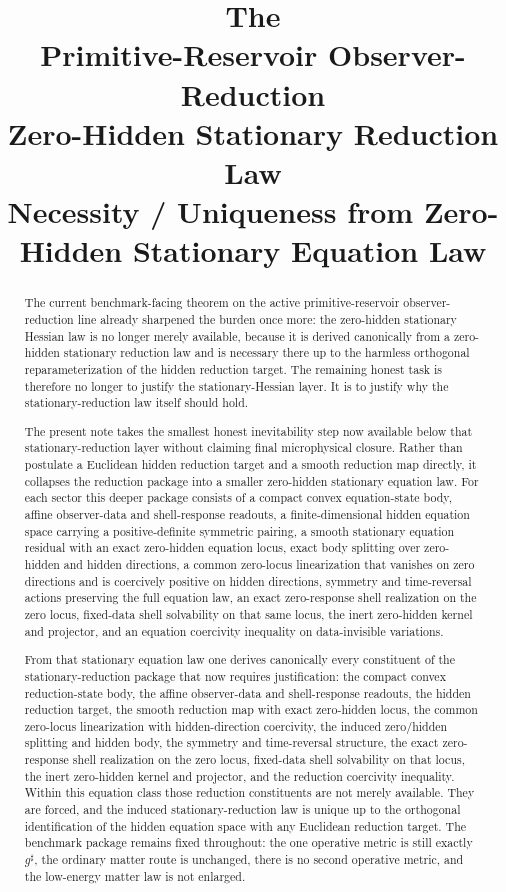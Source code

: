 \documentclass[11pt]{article}
\title{\textbf{The \TheoryName{}}\\[0.4em]
\large Primitive-Reservoir Observer-Reduction\\
\large Zero-Hidden Stationary Reduction Law\\
\large Necessity / Uniqueness from Zero-Hidden Stationary Equation Law}
\author{}
\date{}
\newcommand{\CompletedMetric}{g^{\sharp}}
\begin{document}
\maketitle

\begin{abstract}
The current benchmark-facing theorem on the active primitive-reservoir observer-reduction line already sharpened the burden once more: the zero-hidden stationary Hessian law is no longer merely available, because it is derived canonically from a zero-hidden stationary reduction law and is necessary there up to the harmless orthogonal reparameterization of the hidden reduction target. The remaining honest task is therefore no longer to justify the stationary-Hessian layer. It is to justify why the stationary-reduction law itself should hold.

The present note takes the smallest honest inevitability step now available below that stationary-reduction layer without claiming final microphysical closure. Rather than postulate a Euclidean hidden reduction target and a smooth reduction map directly, it collapses the reduction package into a smaller zero-hidden stationary equation law. For each sector this deeper package consists of a compact convex equation-state body, affine observer-data and shell-response readouts, a finite-dimensional hidden equation space carrying a positive-definite symmetric pairing, a smooth stationary equation residual with an exact zero-hidden equation locus, exact body splitting over zero-hidden and hidden directions, a common zero-locus linearization that vanishes on zero directions and is coercively positive on hidden directions, symmetry and time-reversal actions preserving the full equation law, an exact zero-response shell realization on the zero locus, fixed-data shell solvability on that same locus, the inert zero-hidden kernel and projector, and an equation coercivity inequality on data-invisible variations.

From that stationary equation law one derives canonically every constituent of the stationary-reduction package that now requires justification: the compact convex reduction-state body, the affine observer-data and shell-response readouts, the hidden reduction target, the smooth reduction map with exact zero-hidden locus, the common zero-locus linearization with hidden-direction coercivity, the induced zero/hidden splitting and hidden body, the symmetry and time-reversal structure, the exact zero-response shell realization on the zero locus, fixed-data shell solvability on that locus, the inert zero-hidden kernel and projector, and the reduction coercivity inequality. Within this equation class those reduction constituents are not merely available. They are forced, and the induced stationary-reduction law is unique up to the orthogonal identification of the hidden equation space with any Euclidean reduction target. The benchmark package remains fixed throughout: the one operative metric is still exactly \(\CompletedMetric\), the ordinary matter route is unchanged, there is no second operative metric, and the low-energy matter law is not enlarged.
\end{abstract}
\end{document}
